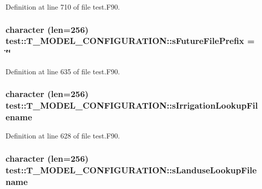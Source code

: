 Definition at line 710 of file test.F90.

\hypertarget{typetest_1_1_t___m_o_d_e_l___c_o_n_f_i_g_u_r_a_t_i_o_n_ac9a65598978a4ab47a8f63352a18514a}{
\subsubsection[{sFutureFilePrefix}]{\setlength{\rightskip}{0pt plus 5cm}character (len=256) {\bf test::T\_\-MODEL\_\-CONFIGURATION::sFutureFilePrefix} = \char`\"{}\char`\"{}}}
\label{typetest_1_1_t___m_o_d_e_l___c_o_n_f_i_g_u_r_a_t_i_o_n_ac9a65598978a4ab47a8f63352a18514a}


Definition at line 635 of file test.F90.

\hypertarget{typetest_1_1_t___m_o_d_e_l___c_o_n_f_i_g_u_r_a_t_i_o_n_ac694ad51e6902afa2e429e451cf83189}{
\subsubsection[{sIrrigationLookupFilename}]{\setlength{\rightskip}{0pt plus 5cm}character (len=256) {\bf test::T\_\-MODEL\_\-CONFIGURATION::sIrrigationLookupFilename}}}
\label{typetest_1_1_t___m_o_d_e_l___c_o_n_f_i_g_u_r_a_t_i_o_n_ac694ad51e6902afa2e429e451cf83189}


Definition at line 628 of file test.F90.

\hypertarget{typetest_1_1_t___m_o_d_e_l___c_o_n_f_i_g_u_r_a_t_i_o_n_a096fcb7fb4959d235d9ba5604a801f11}{
\subsubsection[{sLanduseLookupFilename}]{\setlength{\rightskip}{0pt plus 5cm}character (len=256) {\bf test::T\_\-MODEL\_\-CONFIGURATION::sLanduseLookupFilename}}}
\label{typetest_1_1_t___m_o_d_e_l___c_o_n_f_i_g_u_r_a_t_i_o_n_a096fcb7fb4959d235d9ba5604a801f11}



